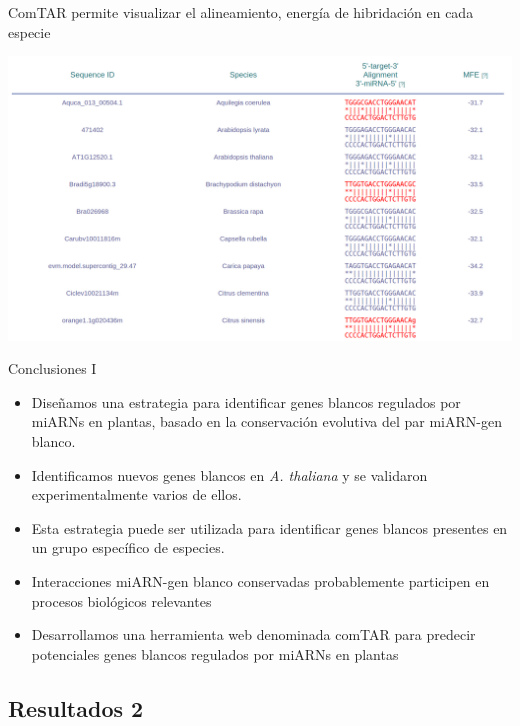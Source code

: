 \documentclass{beamer}
\begin{document}
\begin{frame}{ComTAR permite visualizar el alineamiento, energía de hibridación en cada especie}
	\begin{center}
		\includegraphics[width=.7\textwidth]{img/comTAR_fig2.png}
	\end{center}
\end{frame}


\begin{frame}{Conclusiones I}
	\begin{itemize}
        \item<1-> Diseñamos una estrategia para identificar genes blancos regulados por miARNs en plantas, basado en la conservación evolutiva del par miARN-gen blanco.
        \item<2-> Identificamos nuevos genes blancos en \textit{A. thaliana} y se validaron experimentalmente varios de ellos.
        \item<3-> Esta estrategia puede ser utilizada para identificar genes blancos presentes en un grupo específico de especies.
        \item<4-> Interacciones miARN-gen blanco conservadas probablemente participen en procesos biológicos relevantes
        \item<5-> Desarrollamos una herramienta web denominada comTAR para predecir potenciales genes blancos regulados por miARNs en plantas
	\end{itemize}
\end{frame}


\subsection{Resultados 2}
\end{document}
